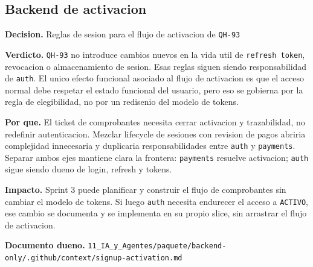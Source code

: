 \subsection{Backend de activacion}

\begin{docnote}
\textbf{Decision.} Reglas de sesion para el flujo de activacion de \texttt{QH-93}

\textbf{Verdicto.} \texttt{QH-93} no introduce cambios nuevos en la vida util de \texttt{refresh token}, revocacion o almacenamiento de sesion. Esas reglas siguen siendo responsabilidad de \texttt{auth}. El unico efecto funcional asociado al flujo de activacion es que el acceso normal debe respetar el estado funcional del usuario, pero eso se gobierna por la regla de elegibilidad, no por un redisenio del modelo de tokens.

\textbf{Por que.} El ticket de comprobantes necesita cerrar activacion y trazabilidad, no redefinir autenticacion. Mezclar lifecycle de sesiones con revision de pagos abriria complejidad innecesaria y duplicaria responsabilidades entre \texttt{auth} y \texttt{payments}. Separar ambos ejes mantiene clara la frontera: \texttt{payments} resuelve activacion; \texttt{auth} sigue siendo dueno de login, refresh y tokens.

\textbf{Impacto.} Sprint 3 puede planificar y construir el flujo de comprobantes sin cambiar el modelo de tokens. Si luego \texttt{auth} necesita endurecer el acceso a \texttt{ACTIVO}, ese cambio se documenta y se implementa en su propio slice, sin arrastrar el flujo de activacion.

\textbf{Documento dueno.} \texttt{11\_IA\_y\_Agentes/paquete/backend-only/.github/context/signup-activation.md}
\end{docnote}

